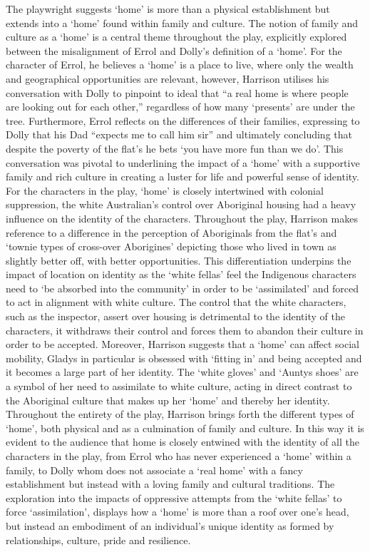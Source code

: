 \documentclass[a4paper]{article}
\begin{document}
The playwright suggests ‘home’ is more than a physical establishment but extends into a
‘home’ found within family and culture. The notion of family and culture as a ‘home’ is a
central theme throughout the play, explicitly explored between the misalignment of Errol and
Dolly’s definition of a ‘home’. For the character of Errol, he believes a ‘home’ is a place to
live, where only the wealth and geographical opportunities are relevant, however, Harrison
utilises his conversation with Dolly to pinpoint to ideal that “a real home is where people are
looking out for each other,” regardless of how many ‘presents’ are under the tree.
Furthermore, Errol reflects on the differences of their families, expressing to Dolly that his
Dad “expects me to call him sir” and ultimately concluding that despite the poverty of the
flat’s he bets ‘you have more fun than we do’. This conversation was pivotal to underlining
the impact of a ‘home’ with a supportive family and rich culture in creating a luster for life and
powerful sense of identity.\\

For the characters in the play, ‘home’ is closely intertwined with colonial suppression, the
white Australian’s control over Aboriginal housing had a heavy influence on the identity of
the characters. Throughout the play, Harrison makes reference to a difference in the
perception of Aboriginals from the flat’s and ‘townie types of cross-over Aborigines’ depicting
those who lived in town as slightly better off, with better opportunities. This differentiation
underpins the impact of location on identity as the ‘white fellas’ feel the Indigenous
characters need to ‘be absorbed into the community’ in order to be ‘assimilated’ and forced
to act in alignment with white culture. The control that the white characters, such as the
inspector, assert over housing is detrimental to the identity of the characters, it withdraws
their control and forces them to abandon their culture in order to be accepted. Moreover,
Harrison suggests that a ‘home’ can affect social mobility, Gladys in particular is obsessed
with ‘fitting in’ and being accepted and it becomes a large part of her identity. The ‘white
gloves’ and ‘Auntys shoes' are a symbol of her need to assimilate to white culture, acting in
direct contrast to the Aboriginal culture that makes up her ‘home’ and thereby her identity.\\

Throughout the entirety of the play, Harrison brings forth the different types of ‘home’, both
physical and as a culmination of family and culture. In this way it is evident to the audience
that home is closely entwined with the identity of all the characters in the play, from Errol
who has never experienced a ‘home’ within a family, to Dolly whom does not associate a
‘real home’ with a fancy establishment but instead with a loving family and cultural traditions.
The exploration into the impacts of oppressive attempts from the ‘white fellas’ to force
‘assimilation’, displays how a ‘home’ is more than a roof over one's head, but instead an
embodiment of an individual's unique identity as formed by relationships, culture, pride and
resilience.\\
\end{document}
